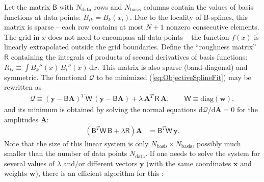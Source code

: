 \documentclass[12pt]{article}
\renewcommand{\d}{\mathrm{d}}
\newcommand{\bA}{\boldsymbol{A}}
\newcommand{\bx}{\boldsymbol{x}}
\newcommand{\by}{\boldsymbol{y}}
\begin{document}
Let the matrix $\mathsf{B}$ with $N_\mathrm{data}$ rows and $N_\mathrm{basis}$ columns contain the values of basis functions at data points: $B_{ik} = B_k(x_i)$. Due to the locality of B-splines, this matrix is sparse -- each row contains at most $N+1$ nonzero consecutive elements. The grid in $x$ does not need to encompass all data points -- the function $f(x)$ is linearly extrapolated outside the grid boundaries.
Define the ``roughness matrix'' $\mathsf{R}$ containing the integrals of products of second derivatives of basis functions: $R_{kl} \equiv \int B_k''(x) \, B_l''(x)\, \d x$. This matrix is also sparse (band-diagonal) and symmetric.
The functional $\mathcal{Q}$ to be minimized (\ref{eq:ObjectiveSplineFit}) may be rewritten as
\begin{align}  \label{eq:ObjectiveSplineFit2}
\mathcal{Q}\equiv (\by - \mathsf{B} \bA)^{T}\, \mathsf{W}\, (\by - \mathsf{B} \bA) +
\lambda\, \bA^T\,\mathsf{R}\, \bA, \qquad \mathsf{W}\equiv \mathrm{diag}(\boldsymbol{w}),
\end{align}
and its minimum is obtained by solving the normal equations $\d\mathcal{Q}/\d\bA=0$ for the amplitudes $\bA$:
\begin{align}  \label{eq:SplineFitSol}
\left(\mathsf{B}^T\mathsf{W\,B} + \lambda \mathsf{R} \right) \bA &= \mathsf{B}^T\mathsf{W}\,\by .
\end{align}
Note that the size of this linear system is only $N_\mathrm{basis}\times N_\mathrm{basis}$, possibly much smaller than the number of data points $N_\mathrm{data}$. If one needs to solve the system for several values of $\lambda$ and/or different vectors $\by$ (with the same coordinates $\bx$ and weights $\boldsymbol{w}$), there is an efficient algorithm for this \cite{RuppertWandCarroll}:
\end{document}
